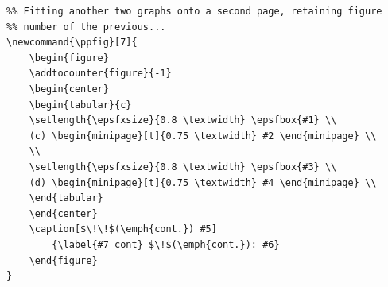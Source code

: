 \begin{verbatim}
%% Fitting another two graphs onto a second page, retaining figure
%% number of the previous...
\newcommand{\ppfig}[7]{
	\begin{figure}
	\addtocounter{figure}{-1}
	\begin{center}
	\begin{tabular}{c}
	\setlength{\epsfxsize}{0.8 \textwidth} \epsfbox{#1} \\
	(c) \begin{minipage}[t]{0.75 \textwidth} #2 \end{minipage} \\
	\\
	\setlength{\epsfxsize}{0.8 \textwidth} \epsfbox{#3} \\
	(d) \begin{minipage}[t]{0.75 \textwidth} #4 \end{minipage} \\
	\end{tabular}
	\end{center}
	\caption[$\!\!$(\emph{cont.}) #5]
		{\label{#7_cont} $\!$(\emph{cont.}): #6}
	\end{figure}
}
\end{verbatim}








